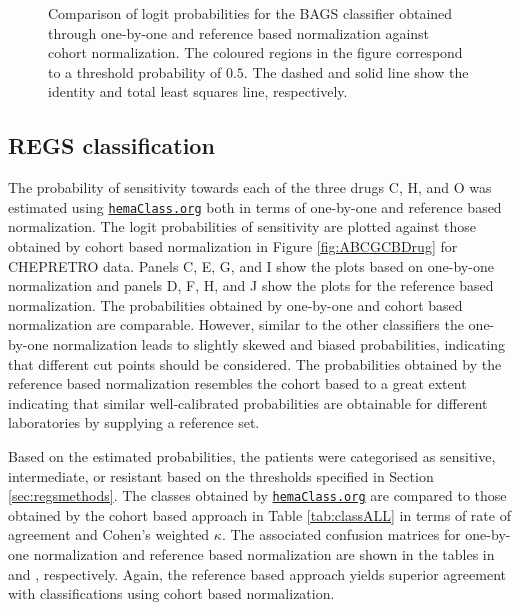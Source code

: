 \documentclass[10pt,letterpaper]{article}
\newcommand{\hemaClass}{\href{http://hemaClass.org}{\texttt{hemaClass.org}}}
\begin{document}
\begin{figure}[!ht]
\caption{
Comparison of logit probabilities for the BAGS classifier obtained through one-by-one and reference based normalization against cohort normalization.
The coloured regions in the figure correspond to a threshold probability of $0.5$.
The dashed and solid line show the identity and total least squares line, respectively.
}
\label{fig:Bagscorr}
\end{figure}



\subsection*{REGS classification}
The probability of sensitivity towards each of the three drugs C, H, and O was estimated using \hemaClass{} both in terms of one-by-one and reference based normalization.
The logit probabilities of sensitivity are plotted against those obtained by cohort based normalization in Figure \ref{fig:ABCGCBDrug} for CHEPRETRO data.
Panels C, E, G, and I show the plots based on one-by-one normalization and panels D, F, H, and J show the plots for the reference based normalization.
The probabilities obtained by one-by-one and cohort based normalization are comparable. However, similar to the other classifiers the one-by-one normalization leads to slightly skewed and biased probabilities, indicating that different cut points should be considered.
The probabilities obtained by the reference based normalization resembles the cohort based to a great extent indicating that similar well-calibrated probabilities are obtainable for different laboratories by supplying a reference set.

Based on the estimated probabilities, the patients were categorised as sensitive, intermediate, or resistant based on the thresholds specified in Section \ref{sec:regsmethods}.
The classes obtained by \hemaClass{} are compared to those obtained by the cohort based approach in Table \ref{tab:classALL} in terms of rate of agreement and Cohen's weighted $\kappa$.
The associated confusion matrices for one-by-one normalization and reference based normalization are shown in
the tables in  and
, respectively.
Again, the reference based approach yields superior agreement with classifications using cohort based normalization.
\end{document}
